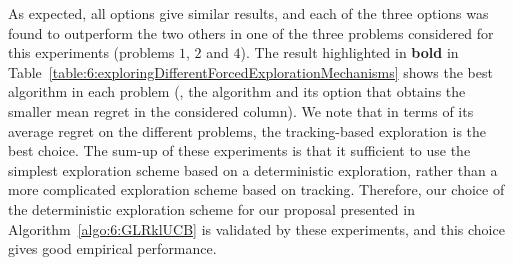 As expected, all options give similar results, and each of the three options was found to outperform the two others in one of the three problems considered for this experiments (problems $1$, $2$ and $4$).
The result highlighted in \textbf{bold} in Table~\ref{table:6:exploringDifferentForcedExplorationMechanisms} shows the best algorithm in each problem (\ie, the algorithm and its option that obtains the smaller mean regret in the considered column).
We note that in terms of its average regret on the different problems, the tracking-based exploration is the best choice.
%
The sum-up of these experiments is that it sufficient to use the simplest exploration scheme based on a deterministic exploration,
rather than a more complicated exploration scheme based on tracking.
Therefore, our choice of the deterministic exploration scheme for our proposal \GLRklUCB{} presented in Algorithm~\ref{algo:6:GLRklUCB} is validated by these experiments, and this choice gives good empirical performance.
